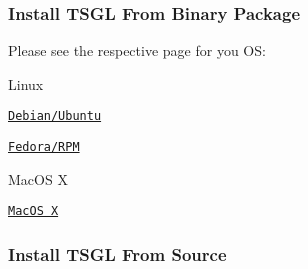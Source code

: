 \subsubsection*{Install T\-S\-G\-L From Binary Package}

Please see the respective page for you O\-S\-:


\begin{DoxyItemize}
\item Linux
\begin{DoxyItemize}
\item \href{https://github.com/Calvin-CS/TSGL/wiki/Debian-%28Aptitude%29}{\tt Debian/\-Ubuntu}
\item \href{https://github.com/Calvin-CS/TSGL/wiki/RPM}{\tt Fedora/\-R\-P\-M}
\end{DoxyItemize}
\item Mac\-O\-S X
\begin{DoxyItemize}
\item \href{https://github.com/Calvin-CS/TSGL/wiki/MacOS-X}{\tt Mac\-O\-S X}
\end{DoxyItemize}
\end{DoxyItemize}

\subsubsection*{Install T\-S\-G\-L From Source}